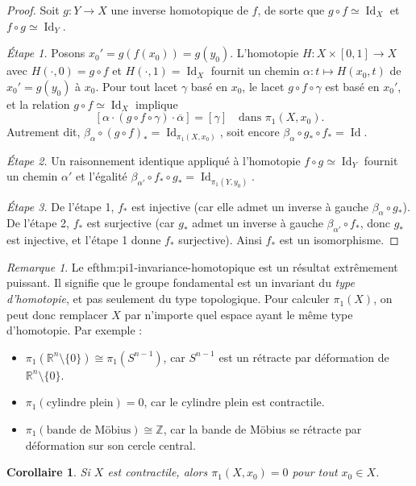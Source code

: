 \documentclass[12pt,a4paper,openany]{book}
\theoremstyle{definition}
\theoremstyle{plain}
\newtheorem{corollaire}[definition]{Corollaire}
\theoremstyle{remark}
\newtheorem{remarque}[definition]{Remarque}
\newcommand{\Z}{\mathbb{Z}}
\newcommand{\R}{\mathbb{R}}
\DeclareMathOperator{\Id}{Id}
\begin{document}
\begin{proof}
Soit $g : Y \to X$ une inverse homotopique de $f$, de sorte que
$g \circ f \simeq \Id_X$ et $f \circ g \simeq \Id_Y$.

\emph{Étape 1.} Posons $x_0' = g(f(x_0)) = g(y_0)$. L'homotopie
$H : X \times [0,1] \to X$ avec $H(\cdot, 0) = g \circ f$ et
$H(\cdot, 1) = \Id_X$ fournit un chemin $\alpha : t \mapsto H(x_0, t)$ de
$x_0' = g(y_0)$ à $x_0$. Pour tout lacet $\gamma$ basé en $x_0$, le lacet
$g \circ f \circ \gamma$ est basé en $x_0'$, et la relation
$g \circ f \simeq \Id_X$ implique
\[
[\alpha \cdot (g \circ f \circ \gamma) \cdot \overline{\alpha}] = [\gamma]
\quad \text{dans } \pi_1(X, x_0).
\]
Autrement dit, $\beta_\alpha \circ (g \circ f)_* = \Id_{\pi_1(X, x_0)}$, soit
encore $\beta_\alpha \circ g_* \circ f_* = \Id$.

\emph{Étape 2.} Un raisonnement identique appliqué à l'homotopie
$f \circ g \simeq \Id_Y$ fournit un chemin $\alpha'$ et l'égalité
$\beta_{\alpha'} \circ f_* \circ g_* = \Id_{\pi_1(Y, y_0)}$.

\emph{Étape 3.} De l'étape 1, $f_*$ est injective (car elle admet un inverse à
gauche $\beta_\alpha \circ g_*$). De l'étape 2, $f_*$ est surjective (car
$g_*$ admet un inverse à gauche $\beta_{\alpha'} \circ f_*$, donc $g_*$ est
injective, et l'étape 1 donne $f_*$ surjective). Ainsi $f_*$ est un
isomorphisme.
\end{proof}

\begin{remarque}\label{rem:invariance-homotopique-pratique}
Le 
ef{thm:pi1-invariance-homotopique} est un résultat extrêmement puissant.
Il signifie que le groupe fondamental est un invariant du \emph{type d'homotopie},
et pas seulement du type topologique. Pour calculer $\pi_1(X)$, on peut donc
remplacer $X$ par n'importe quel espace ayant le même type d'homotopie. Par
exemple :
\begin{itemize}
\item $\pi_1(\R^n \setminus \{0\}) \cong \pi_1(S^{n-1})$, car
$S^{n-1}$ est un rétracte par déformation de $\R^n \setminus \{0\}$.
\item $\pi_1(\text{cylindre plein}) = 0$, car le cylindre plein est contractile.
\item $\pi_1(\text{bande de Möbius}) \cong \Z$, car la bande de Möbius se
rétracte par déformation sur son cercle central.
\end{itemize}
\end{remarque}

\begin{corollaire}\label{cor:contractile-pi1-trivial}
Si $X$ est contractile, alors $\pi_1(X, x_0) = 0$ pour tout $x_0 \in X$.
\end{corollaire}
\end{document}
